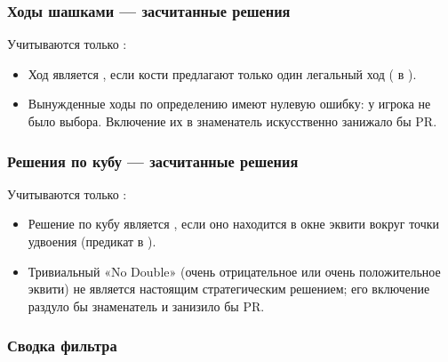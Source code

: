 \documentclass[letterpaper,10pt,russian]{sphinxmanual}
\begin{document}
\subsubsection{Ходы шашками — засчитанные решения}
\label{\detokenize{stats_parity:coups-de-pions-decisions-comptees}}
\sphinxAtStartPar
Учитываются только :
\begin{itemize}
\item {} 
\sphinxAtStartPar
Ход является , если кости предлагают только один легальный ход ( в ).

\item {} 
\sphinxAtStartPar
Вынужденные ходы по определению имеют нулевую ошибку: у игрока не было выбора. Включение их в знаменатель искусственно занижало бы PR.

\end{itemize}


\subsubsection{Решения по кубу — засчитанные решения}
\label{\detokenize{stats_parity:decisions-de-cube-decisions-comptees}}
\sphinxAtStartPar
Учитываются только :
\begin{itemize}
\item {} 
\sphinxAtStartPar
Решение по кубу является , если оно находится в окне эквити \sphinxcode{\sphinxupquote{{[}\sphinxhyphen{}0.16, +0.16{]}}} вокруг точки удвоения (предикат  в ).

\item {} 
\sphinxAtStartPar
Тривиальный «No Double» (очень отрицательное или очень положительное эквити) не является настоящим стратегическим решением; его включение раздуло бы знаменатель и занизило бы PR.

\end{itemize}


\subsubsection{Сводка фильтра}
\label{\detokenize{stats_parity:resume-du-filtre}}
\end{document}
